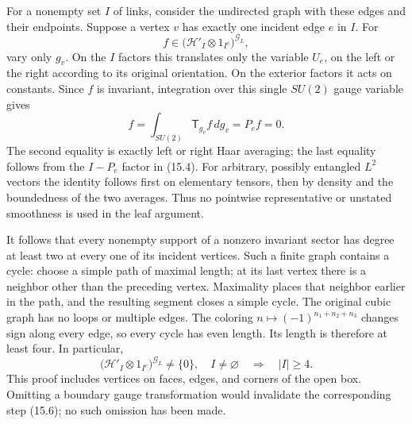 \documentclass[
]{article}
\begin{document}
For a nonempty set \(I\) of links, consider the undirected graph with
these edges and their endpoints. Suppose a vertex \(v\) has exactly one
incident edge \(e\) in \(I\). For \[
f\in\bigl(\mathcal H'_I\otimes1_{I^c}\bigr)^{\mathcal G_L},
\] vary only \(g_v\). On the \(I\) factors this translates only the
variable \(U_e\), on the left or the right according to its original
orientation. On the exterior factors it acts on constants. Since \(f\)
is invariant, integration over this single \(SU(2)\) gauge variable
gives \[
f=\int_{SU(2)}\mathsf T_{g_v}f\,dg_v=P_ef=0.                 \tag{15.6}
\] The second equality is exactly left or right Haar averaging; the last
equality follows from the \(I-P_e\) factor in (15.4). For arbitrary,
possibly entangled \(L^2\) vectors the identity follows first on
elementary tensors, then by density and the boundedness of the two
averages. Thus no pointwise representative or unstated smoothness is
used in the leaf argument.

It follows that every nonempty support of a nonzero invariant sector has
degree at least two at every one of its incident vertices. Such a finite
graph contains a cycle: choose a simple path of maximal length; at its
last vertex there is a neighbor other than the preceding vertex.
Maximality places that neighbor earlier in the path, and the resulting
segment closes a simple cycle. The original cubic graph has no loops or
multiple edges. The coloring \(n\mapsto(-1)^{n_1+n_2+n_3}\) changes sign
along every edge, so every cycle has even length. Its length is
therefore at least four. In particular, \[
\bigl(\mathcal H'_I\otimes1_{I^c}\bigr)^{\mathcal G_L}
 \ne\{0\},\quad I\ne\varnothing
\quad\Longrightarrow\quad |I|\ge4.                          \tag{15.7}
\] This proof includes vertices on faces, edges, and corners of the open
box. Omitting a boundary gauge transformation would invalidate the
corresponding step (15.6); no such omission has been made.
\end{document}
